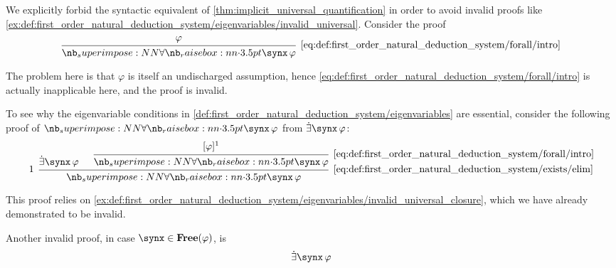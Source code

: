 \begin{example}\label{ex:def:first_order_natural_deduction_system/eigenvariables}
  \hfill
  \begin{thmenum}
     We explicitly forbid the syntactic equivalent of \cref{thm:implicit_universal_quantification} in order to avoid invalid proofs like \cref{ex:def:first_order_natural_deduction_system/eigenvariables/invalid_universal}. Consider the proof
    \begin{equation*}
      \begin{prooftree}
        \hypo{ \varphi }
        \infer1[\ref{eq:def:first_order_natural_deduction_system/forall/intro}]{ \qforall \synx \varphi }
      \end{prooftree}
    \end{equation*}

    The problem here is that \( \varphi \) is itself an undischarged assumption, hence \eqref{eq:def:first_order_natural_deduction_system/forall/intro} is actually inapplicable here, and the proof is invalid.

     To see why the eigenvariable conditions in \cref{def:first_order_natural_deduction_system/eigenvariables} are essential, consider the following proof of \( \qforall \synx \varphi \) from \( \qexists \synx \varphi \):
    \begin{equation*}
      \begin{prooftree}
        \hypo{ \qexists \synx \varphi }

        \hypo{ [\varphi]^1 }
        \infer1[\ref{eq:def:first_order_natural_deduction_system/forall/intro}]{ \qforall \synx \varphi }

        \infer[left label=\( 1 \)]2[\ref{eq:def:first_order_natural_deduction_system/exists/elim}]{ \qforall \synx \varphi }
      \end{prooftree}
    \end{equation*}

    This proof relies on \cref{ex:def:first_order_natural_deduction_system/eigenvariables/invalid_universal_closure}, which we have already demonstrated to be invalid.

     Another invalid proof, in case \( \synx \in \op*{Free}(\varphi) \), is
    \begin{equation*}
      \begin{prooftree}
        \hypo{ \qexists \synx \varphi }


\end{prooftree}
\end{equation*}
\end{thmenum}
\end{example}

